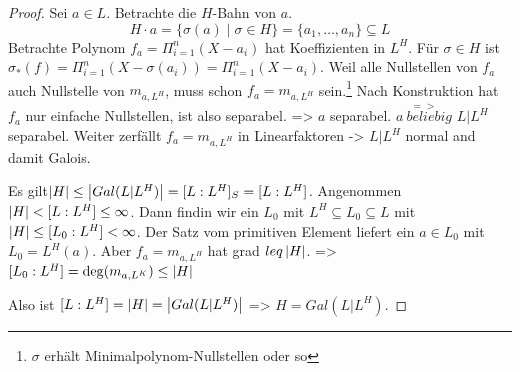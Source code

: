 \documentclass[../main.tex]{subfiles}
\begin{document}
\begin{proof}
    Sei $a\in L$. Betrachte die $H$-Bahn von $a$.
    $$H\cdot a = \{\sigma(a)\mid \sigma\in H\} = \{a_1,\dots, a_n\} \subseteq L$$
    Betrachte Polynom $f_a = \Pi_{i=1}^n (X-a_i)$ hat Koeffizienten in $L^H$.
    Für $\sigma\in H$ ist $\sigma_*(f) = \Pi_{i=1}^n(X-\sigma(a_i)) = \Pi_{i=1}^n(X-a_i)$.
    Weil alle Nullstellen von $f_a$ auch Nullstelle von $m_{a,L^H}$, muss schon $f_a=m_{a,L^H}$ sein.\footnote{$\sigma$ erhält Minimalpolynom-Nullstellen oder so}
    Nach Konstruktion hat $f_a$ nur einfache Nullstellen, ist also separabel. => $a$ separabel. $\overset{=>}{a\ beliebig}$ $L|L^H$separabel.
    Weiter zerfällt $f_a=m_{a,L^H}$ in Linearfaktoren -> $L|L^H$ normal and damit Galois.

    Es gilt$\left\vert H \right\vert\leq \left\vert Gal(L|L^H) \right\vert = [L:L^H]_S = [L:L^H]$.
    Angenommen $\left\vert H \right\vert < [L:L^H]\leq \infty$. 
    Dann findin wir ein $L_0$ mit $L^H\subseteq L_0 \subseteq L$ mit $\left\vert H \right\vert \leq [L_0:L^H] <\infty$.
    Der Satz vom primitiven Element liefert ein $a\in L_0$ mit $L_0 = L^H(a)$.
    Aber $f_a=m_{a,L^H}$ hat grad $leq \left\vert H \right\vert$.
    => $[L_0:L^H] = \deg(m_{a,L^K})\leq \left\vert H \right\vert$ \Lightning

    Also ist $[L:L^H] = \left\vert H \right\vert = \left\vert Gal(L|L^H) \right\vert$
    => $H=Gal(L|L^H)$.
\end{proof}
\end{document}
